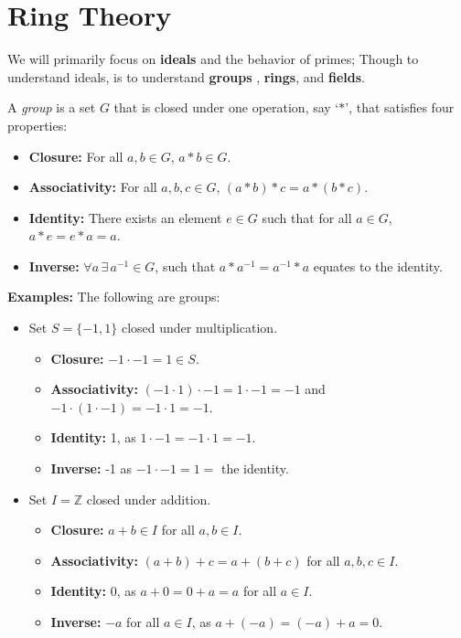 \section{Ring Theory}
We will primarily focus on \textbf{ideals} and the behavior of primes; Though
to understand ideals, is to understand \textbf{groups }, \textbf{rings}, and \textbf{fields}.

\begin{Def}[Group]

    A \textit{group} is a set $G$ that is closed under one operation, say `$*$', that satisfies four properties:
    \begin{itemize}
        \item \textbf{Closure:} For all $a,b\in G$, $a*b\in G$.
        \item \textbf{Associativity:} For all $a,b,c\in G$, $(a*b)*c=a*(b*c)$.
        \item \textbf{Identity:} There exists an element $e\in G$ such that for all $a\in G$, $a*e=e*a=a$.
        \item \textbf{Inverse:} $\forall a\,\exists\, a^{-1}\in G$, such that $a*a^{-1}=a^{-1}*a$ equates to the identity.
    \end{itemize}
\end{Def}
\newpage

\noindent
\textbf{Examples:} The following are groups:
\begin{itemize}
    \item Set $S=\{-1,1\}$ closed under multiplication.
          \begin{itemize}
              \item \textbf{Closure:} $-1\cdot-1=1\in S$.
              \item \textbf{Associativity:} $(-1\cdot1)\cdot-1=1\cdot-1=-1$ and $-1\cdot(1\cdot-1)=-1\cdot1=-1$.
              \item \textbf{Identity:} 1, as $1 \cdot -1=-1\cdot1=-1$.
              \item \textbf{Inverse:} -1 as $-1\cdot-1=1=$ the identity.
          \end{itemize}

    \item Set $I=\mathbb{Z}$ closed under addition.
          \begin{itemize}
              \item \textbf{Closure:} $a+b\in I$ for all $a,b\in I$.
              \item \textbf{Associativity:} $(a+b)+c=a+(b+c)$ for all $a,b,c\in I$.
              \item \textbf{Identity:} 0, as $a+0=0+a=a$ for all $a\in I$.
              \item \textbf{Inverse:} $-a$ for all $a\in I$, as $a+(-a)=(-a)+a=0$.
          \end{itemize}
\end{itemize}

